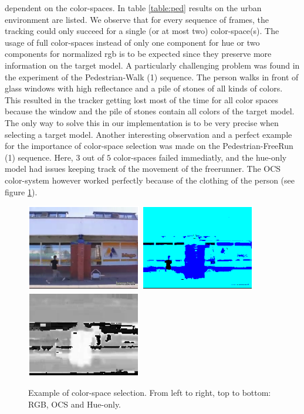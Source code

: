 \documentclass[a4paper,11pt]{article}
\begin{document}
		dependent on the color-spaces. In table \ref{table:ped} results on the urban environment are listed.
		We observe that for every sequence of frames, the tracking could only succeed for a single (or at
		most two) color-space(s). The usage of full color-spaces instead of only one component for hue or
		two components for normalized rgb is to be expected since they preserve more information on the
		target model. A particularly challenging problem was found in the experiment of the Pedestrian-Walk
		(1) sequence. The person walks in front of glass windows with high reflectance and a pile of stones
		of all kinds of colors. This resulted in the tracker getting lost most of the time for all color
		spaces because the window and the pile of stones contain all colors of the target model. The only
		way to solve this in our implementation is to be very precise when selecting a target model. Another
		interesting observation and a perfect example for the importance of color-space selection was made
		on the Pedestrian-FreeRun (1) sequence. Here, $3$ out of $5$ color-spaces failed immediatly, and the
		hue-only model had issues keeping track of the movement of the freerunner. The OCS color-system
		however worked perfectly because of the clothing of the person (see figure \ref{fig:FREE}). 
		\begin{figure}[H]
			\begin{center}
				\includegraphics[width=5cm]{img/example_free1.eps}
				\includegraphics[width=5cm]{img/example_free2.eps}
				\includegraphics[width=5cm]{img/example_free3.eps}\\
			\end{center}
			\caption{
				Example of color-space selection. From left to
				right, top to bottom: RGB, OCS and Hue-only.
			}
			\label{fig:FREE}
		\end{figure}
		
\end{document}
